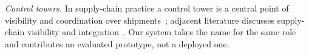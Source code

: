 \textit{Control towers.} In supply-chain practice a control tower is a central point of visibility and coordination over shipments~\cite{trzuskawska2017control}; adjacent literature discusses supply-chain visibility and integration~\cite{barratt2007antecedents,somapa2018characterizing,francis2008supply,chaffin2024systematic}. Our system takes the name for the same role and contributes an evaluated prototype, not a deployed one.
